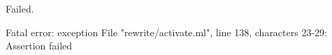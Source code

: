 \chklistingfalse
{}
\begin{ChkListingMsg}
Failed.
\end{ChkListingMsg}
\begin{ChkListingErr}
Fatal error: exception File "rewrite/activate.ml", line 138, characters 23-29: Assertion failed
\end{ChkListingErr}
